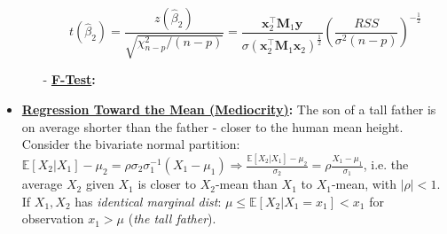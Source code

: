 \documentclass[9pt, landscape]{article}
\begin{document}
\begin{multicols*}{3}
\begin{itemize}
\begin{itemize}[leftmargin=10pt,noitemsep,topsep=0pt,partopsep=0pt]
		{\scriptsize$$
		t(\widehat{\beta}_2) = \frac{z(\widehat{\beta}_2)}{\sqrt{\chi^2_{n-p}/(n-p)}} = \frac{\bm{x}^{\top}_2 \bm{M}_1 \bm{y}}{\sigma(\bm{x}_2^{\top} \bm{M}_1 \bm{x}_2)^{\frac{1}{2}}} \left(\frac{RSS}{\sigma^2 (n-p)}\right)^{-\frac{1}{2}}
		$$}
		\item[-] \textbf{\href{https://en.wikipedia.org/wiki/F-test}{F-Test}:}
	\end{itemize}
	\item \textbf{\href{https://en.wikipedia.org/wiki/Regression_toward_the_mean}{Regression Toward the Mean (Mediocrity)}:} The son of a tall father is on average shorter than the father - closer to the human mean height. Consider the bivariate normal partition: $\mathbb{E}\left[X_2|X_1\right] - \mu_{2} = \rho \sigma_2 \sigma_1^{-1} (X_1 - \mu_1) \Rightarrow \frac{\mathbb{E}\left[X_2|X_1\right] - \mu_2}{\sigma_2} = \rho \frac{X_1 - \mu_1}{\sigma_1}$, i.e. the average $X_2$ given $X_1$ is closer to $X_2$-mean than $X_1$ to $X_1$-mean, with $|\rho|<1$. If $X_1, X_2$ has \textit{identical marginal dist}: $\mu \leq \mathbb{E}\left[X_2 | X_1=x_1\right] < x_1$ for observation $x_1 > \mu$ (\textit{the tall father}).
\end{itemize}


\end{multicols*}
\end{document}
